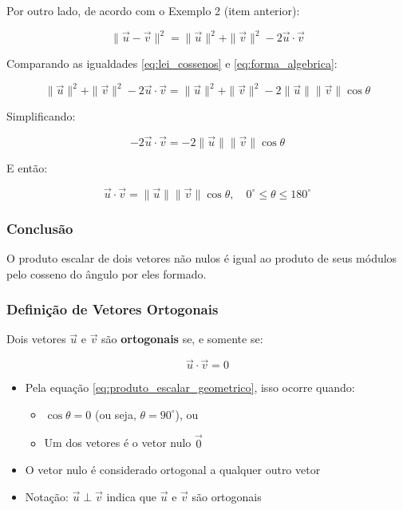 Por outro lado, de acordo com o Exemplo 2 (item anterior):

\begin{equation}
  \|\vec{u} - \vec{v}\|^2 = \|\vec{u}\|^2 + \|\vec{v}\|^2 - 2\vec{u} \cdot \vec{v}
  \label{eq:forma_algebrica}
\end{equation}

Comparando as igualdades \eqref{eq:lei_cossenos} e \eqref{eq:forma_algebrica}:

\[
  \|\vec{u}\|^2 + \|\vec{v}\|^2 - 2\vec{u} \cdot \vec{v} = \|\vec{u}\|^2 + \|\vec{v}\|^2 - 2\|\vec{u}\|\|\vec{v}\|\cos\theta
\]

Simplificando:

\[
  -2\vec{u} \cdot \vec{v} = -2\|\vec{u}\|\|\vec{v}\|\cos\theta
\]

E então:

\[
  \vec{u} \cdot \vec{v} = \|\vec{u}\| \|\vec{v}\| \cos\theta, \quad 0^\circ \leq \theta \leq 180^\circ
\]

\subsubsection*{Conclusão}
O produto escalar de dois vetores não nulos é igual ao produto de seus módulos
pelo cosseno do ângulo por eles formado.

\subsubsection*{Definição de Vetores Ortogonais}
Dois vetores $\vec{u}$ e $\vec{v}$ são \textbf{ortogonais} se, e somente se:

\begin{equation}
  \vec{u} \cdot \vec{v} = 0
  \label{eq:ortogonalidade}
\end{equation}

\begin{itemize}
  \item Pela equação \eqref{eq:produto_escalar_geometrico}, isso ocorre quando:
  \begin{itemize}
    \item $\cos\theta = 0$ (ou seja, $\theta = 90^\circ$), ou
    \item Um dos vetores é o vetor nulo $\vec{0}$
  \end{itemize}
  \item O vetor nulo é considerado ortogonal a qualquer outro vetor
  \item Notação: $\vec{u} \perp \vec{v}$ indica que $\vec{u}$ e $\vec{v}$ são ortogonais
\end{itemize}

